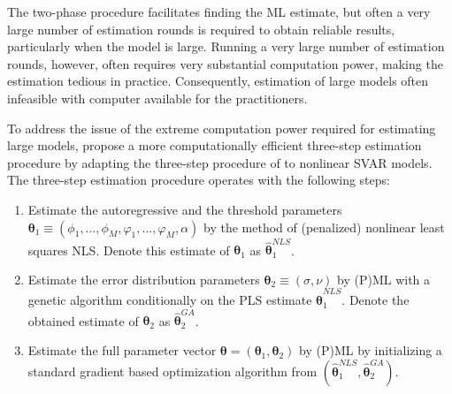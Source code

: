 \documentclass[nojss]{jss}
\begin{document}
The two-phase procedure facilitates finding the ML estimate, but often a very large number of estimation rounds is required to obtain reliable results, particularly when the model is large. Running a very large number of estimation rounds, however, often requires very substantial computation power, making the estimation tedious in practice. Consequently, estimation of large models often infeasible with computer available for the practitioners.

To address the issue of the extreme computation power required for estimating large models, \cite{Virolainen2:2024} propose a more computationally efficient three-step estimation procedure by adapting the three-step procedure of \cite{Lanne+Meitz+Saikkonen:2017} to nonlinear SVAR models. The three-step estimation procedure operates with the following steps:
\begin{enumerate}
  \item Estimate the autoregressive and the threshold parameters $\boldsymbol{\theta}_1\equiv (\phi_{1},...,\phi_{M},\varphi_1,...,\varphi_M,\alpha)$ by the method of (penalized) nonlinear least squares NLS. Denote this estimate of $\boldsymbol{\theta}_1$ as $\hat{\boldsymbol{\theta}}_1^{NLS}$.\label{step:LS}

  \item Estimate the error distribution parameters $\boldsymbol{\theta}_2\equiv (\sigma,\nu)$ by (P)ML with a genetic algorithm conditionally on the PLS estimate $\hat{\boldsymbol{\theta}}_1^{NLS}$. Denote the obtained estimate of $\boldsymbol{\theta}_2$ as $\hat{\boldsymbol{\theta}}_2^{GA}$.\label{step:GA}

 \item Estimate the full parameter vector $\boldsymbol{\theta}=(\boldsymbol{\theta}_1,\boldsymbol{\theta}_2)$ by (P)ML by initializing a standard gradient based optimization algorithm from $(\hat{\boldsymbol{\theta}}_1^{NLS},\hat{\boldsymbol{\theta}}_2^{GA})$.\label{step:VA}
\end{enumerate}
\end{document}

